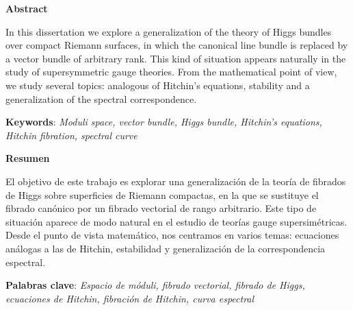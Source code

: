 \documentclass[12pt,a4paper]{book}
\theoremstyle{definition} \newtheorem{defn}[thm]{Definition}
\theoremstyle{definition} \newtheorem{ejemplo}[thm]{Example}
\theoremstyle{remark} \newtheorem{rem}[thm]{Remark}
\begin{document}
\newpage\thispagestyle{empty}
\vspace*{3cm}
\begin{center}
  \textbf{Abstract}
\end{center}
  In this dissertation we explore a generalization of the theory of Higgs bundles over compact Riemann surfaces, in which the canonical line bundle is replaced by a vector bundle of arbitrary rank. This kind of situation appears naturally in the study of supersymmetric gauge theories. From the mathematical point of view, we study several topics: analogous of Hitchin's equations, stability and a generalization of the spectral correspondence.

  \vspace{.5 cm}

  \noindent \textbf{Keywords}: \textit{Moduli space, vector bundle, Higgs bundle, Hitchin's equations, Hitchin fibration, spectral curve}


\begin{center}
  \textbf{Resumen}
\end{center}

  El objetivo de este trabajo es explorar una generalización de la
 teoría de fibrados de Higgs sobre superficies de Riemann compactas,
  en la que se sustituye el fibrado canónico por un fibrado vectorial de rango arbitrario. Este tipo de situación aparece de modo natural en el estudio de teorías gauge supersimétricas. Desde el punto de vista matemático, nos centramos en varios temas: ecuaciones análogas a las de Hitchin, estabilidad y generalización de la correspondencia espectral.

  \vspace{.5 cm}

  \noindent \textbf{Palabras clave}: \textit{Espacio de móduli, fibrado vectorial, fibrado de Higgs, ecuaciones de Hitchin, fibración de Hitchin, curva espectral}

\end{document}

